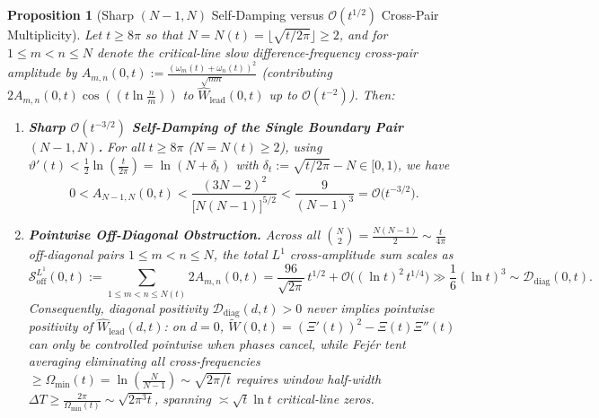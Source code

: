 \documentclass[11pt,reqno]{amsart}
\newtheorem{proposition}[theorem]{Proposition}
\theoremstyle{definition}
\theoremstyle{remark}
\numberwithin{equation}{section}
\begin{document}
\begin{proposition}[Sharp $(N-1,N)$ Self-Damping versus $\mathcal{O}(t^{1/2})$ Cross-Pair Multiplicity]\label{prop:boundary_vs_offdiag}
Let $t \ge 8\pi$ so that $N = N(t) = \lfloor\sqrt{t/2\pi}\rfloor \ge 2$, and for $1 \le m < n \le N$ denote the critical-line slow difference-frequency cross-pair amplitude by $A_{m,n}(0,t) := \frac{(\omega_m(t) + \omega_n(t))^2}{\sqrt{mn}}$ (contributing $2A_{m,n}(0,t)\cos((t\ln\frac{n}{m}))$ to $\widehat{W}_{\mathrm{lead}}(0,t)$ up to $\mathcal{O}(t^{-2})$). Then:
\begin{enumerate}[label=\textup{(\roman*)},leftmargin=2.2em]
\item \textbf{Sharp $\mathcal{O}(t^{-3/2})$ Self-Damping of the Single Boundary Pair $(N-1,N)$.} For all $t \ge 8\pi$ ($N = N(t) \ge 2$), using $\vartheta'(t) < \frac{1}{2}\ln(\frac{t}{2\pi}) = \ln(N + \delta_t)$ with $\delta_t := \sqrt{t/2\pi} - N \in [0, 1)$, we have
\begin{equation}\label{eq:sharp_boundary_pair}
0 < A_{N-1,N}(0,t) < \frac{(3N - 2)^2}{\bigl[N(N-1)\bigr]^{5/2}} < \frac{9}{(N-1)^3} = \mathcal{O}\bigl(t^{-3/2}\bigr).
\end{equation}
\item \textbf{Pointwise Off-Diagonal Obstruction.} Across all $\binom{N}{2} = \frac{N(N-1)}{2} \sim \frac{t}{4\pi}$ off-diagonal pairs $1 \le m < n \le N$, the total $L^1$ cross-amplitude sum scales as
\begin{equation}\label{eq:offdiag_obstruction}
\mathcal{S}_{\mathrm{off}}^{L^1}(0,t) := \sum_{1 \le m < n \le N(t)} 2A_{m,n}(0,t) = \frac{96}{\sqrt{2\pi}}\,t^{1/2} + \mathcal{O}\bigl((\ln t)^2\,t^{1/4}\bigr) \gg \frac{1}{6}(\ln t)^3 \sim \mathcal{D}_{\mathrm{diag}}(0,t).
\end{equation}
Consequently, diagonal positivity $\mathcal{D}_{\mathrm{diag}}(d,t) > 0$ never implies pointwise positivity of $\widehat{W}_{\mathrm{lead}}(d,t)$: on $d = 0$, $\widetilde{W}(0,t) = (\Xi'(t))^2 - \Xi(t)\Xi''(t)$ can only be controlled pointwise when phases cancel, while Fej\'er tent averaging eliminating all cross-frequencies $\ge \Omega_{\min}(t) = \ln(\frac{N}{N-1}) \sim \sqrt{2\pi/t}$ requires window half-width $\Delta T \ge \frac{2\pi}{\Omega_{\min}(t)} \sim \sqrt{2\pi^3 t}$, spanning $\asymp \sqrt{t}\ln t$ critical-line zeros.
\end{enumerate}
\end{proposition}
\end{document}
